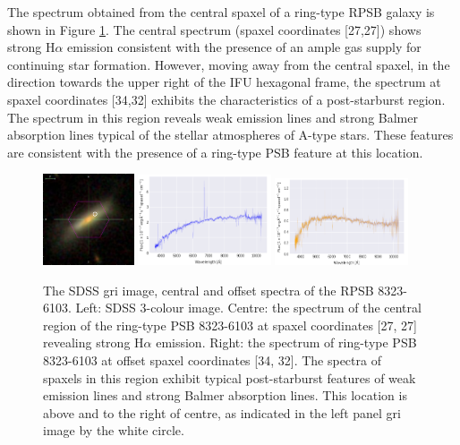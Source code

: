 The spectrum obtained from the central spaxel of a ring-type RPSB galaxy is shown in Figure \ref{fig:RPSB-8323-6103-spec}. The central spectrum (spaxel coordinates [27,27]) shows strong H$\alpha$ emission consistent with the presence of an ample gas supply for continuing star formation. However, moving away from the central spaxel, in the direction towards the upper right of the IFU hexagonal frame, the spectrum at spaxel coordinates [34,32] exhibits the characteristics of a post-starburst region. The spectrum in this region reveals weak emission lines and strong Balmer absorption lines typical of the stellar atmospheres of A-type stars. These features are consistent with the presence of a ring-type PSB feature at this location.

\begin{figure}
    \centering
    \includegraphics[width=0.24\textwidth]{images/Cutouts/RPSB-8323-6103-CIRCLED.png}
    \hfill
    \includegraphics[width=0.35\textwidth]{images/Spectra/RPSB-8323-6103-27-27.png}
    \hfill
    \includegraphics[width=0.35\textwidth]{images/Spectra/RPSB-8323-6103-34-32.png}
    \caption[Image and central and offset spectra of the RPSB 8323-6103]{The SDSS gri image, central and offset spectra of the RPSB 8323-6103. Left: SDSS 3-colour image. 
    Centre: the spectrum of the central region of the ring-type PSB 8323-6103 at spaxel coordinates [27, 27] revealing strong H$\alpha$ emission. 
    Right: the spectrum of ring-type PSB 8323-6103 at offset spaxel coordinates [34, 32].  The spectra of spaxels in this region exhibit typical post-starburst features of weak emission lines and strong Balmer absorption lines. This location is above and to the right of centre, as indicated in the left panel gri image by the white circle.}
    \label{fig:RPSB-8323-6103-spec}
\end{figure}

